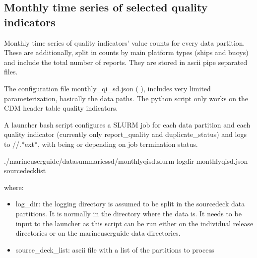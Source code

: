 \documentclass[letterpaper,10pt,english]{sphinxmanual}
\begin{document}
\subsection{Monthly time series of selected quality indicators}
\label{\detokenize{index:qi-counts-sd-section}}\label{\detokenize{index:id4}}
Monthly time series of quality indicators’ value counts for every  data
partition. These are additionally, split in counts by main platform types (ships
and buoys) and include the total number of reports. They are stored in ascii
pipe separated files.

The configuration file monthly\_qi\_sd.json ( {\hyperref[\detokenize{index:qi-counts-sd}]{}}), includes very
limited parameterization, basically the data paths. The python script only works
on the CDM header table quality indicators.

A launcher bash script configures a SLURM job for each  data partition
and each quality indicator (currently only report\_quality and duplicate\_status)
and logs to //\sphinxhyphen{}.*ext*, with  being 
or  depending on job termination status.

\begin{sphinxVerbatim}[commandchars=\\\{\}]
./marine\PYGZhy{}user\PYGZhy{}guide/data\PYGZus{}summaries\PYGZus{}sd/monthly\PYGZus{}qi\PYGZus{}sd.slurm log\PYGZus{}dir monthly\PYGZus{}qi\PYGZus{}sd.json source\PYGZus{}deck\PYGZus{}list
\end{sphinxVerbatim}

where:
\begin{itemize}
\item {} 
log\_dir: the logging directory is assumed to be split in the source\sphinxhyphen{}deck data
partitions. It is normally  in the directory where the data is.
It needs to be input to the launcher as this script can be run either on the
individual release directories or on the marine\sphinxhyphen{}user\sphinxhyphen{}guide data directories.

\item {} 
source\_deck\_list: ascii file with a list of the  partitions to process

\end{itemize}
\end{document}
